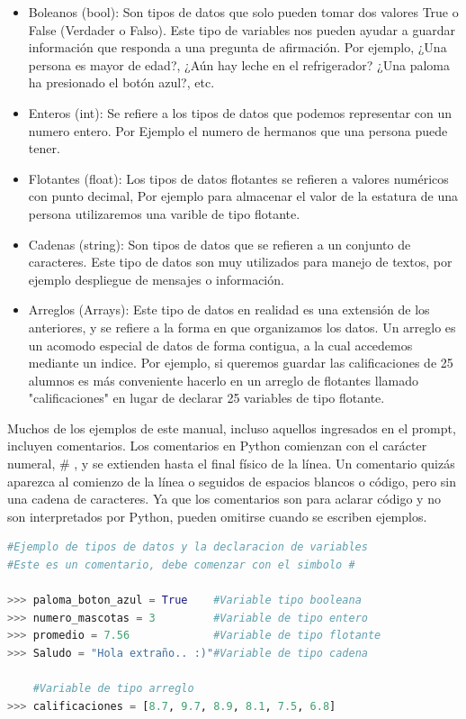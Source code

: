 \documentclass[a4paper, openright, 12pt]{article}
\begin{document}
        \begin{itemize}
          \item{Boleanos (bool): Son tipos de datos que solo pueden tomar dos valores True o False (Verdader o Falso). Este tipo de variables nos pueden ayudar a guardar información que responda a una pregunta de afirmación. Por ejemplo, ¿Una persona es mayor de edad?, ¿Aún hay leche en el refrigerador? ¿Una paloma ha presionado el botón azul?, etc.}
          \item{Enteros (int): Se refiere a los tipos de datos que podemos representar con un numero entero. Por Ejemplo el numero de hermanos que una persona puede tener.}
          \item{Flotantes (float): Los tipos de datos flotantes se refieren a valores numéricos con punto decimal, Por ejemplo para almacenar el valor de la estatura de una persona utilizaremos una varible de tipo flotante.}
          \item{Cadenas (string): Son tipos de datos que se refieren a un conjunto de caracteres. Este tipo de datos son muy utilizados para manejo de textos, por ejemplo despliegue de mensajes o información.}
          \item{Arreglos (Arrays): Este tipo de datos en realidad es una extensión de los anteriores, y se refiere a la forma en que organizamos los datos. Un arreglo es un acomodo especial de datos de forma contigua, a la cual accedemos mediante un indice.
          Por ejemplo, si queremos guardar las calificaciones de 25 alumnos es más conveniente hacerlo en un arreglo de flotantes llamado "calificaciones" en lugar de declarar 25 variables de tipo flotante.}
        \end{itemize}

        Muchos  de  los  ejemplos  de  este  manual,  incluso  aquellos  ingresados  en  el  prompt,  incluyen comentarios.  Los  comentarios  en  Python  comienzan  con  el  carácter  numeral, # ,  y  se  extienden  hasta  el final  físico  de  la  línea.  Un  comentario  quizás  aparezca  al  comienzo  de  la  línea  o  seguidos  de  espacios blancos  o  código,  pero  sin  una  cadena  de  caracteres. Ya  que  los  comentarios  son  para  aclarar  código  y  no  son interpretados por Python, pueden omitirse cuando se escriben ejemplos.\\

    \begin{lstlisting}[language=Python]
#Ejemplo de tipos de datos y la declaracion de variables
#Este es un comentario, debe comenzar con el simbolo #

>>> paloma_boton_azul = True    #Variable tipo booleana
>>> numero_mascotas = 3         #Variable de tipo entero
>>> promedio = 7.56             #Variable de tipo flotante
>>> Saludo = "Hola extraño.. :)"#Variable de tipo cadena

    #Variable de tipo arreglo
>>> calificaciones = [8.7, 9.7, 8.9, 8.1, 7.5, 6.8]
    \end{lstlisting}
\end{document}
